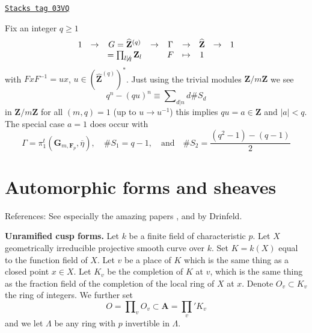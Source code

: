\begin{example}[Commutative]
\label{trace-example-commutative}
\href{https://stacks.math.columbia.edu/tag/03VQ}{\texttt{Stacks tag 03VQ}}

Fix an integer $q\geq 1$
$$
\begin{matrix}
1 &
\to &
G = \widehat{\mathbf{Z}}^{(q)} &
\to &
\Gamma &
\to &
\widehat{\mathbf{Z}} &
\to &
1 \\
&
&
= \prod_{l\not \mid q} \mathbf{Z}_l &
&
F &
\mapsto &
1
\end{matrix}
$$
with $FxF^{-1} = ux$, $u \in (\widehat{\mathbf{Z}}^{(q)})^*$.
Just using the trivial modules
$\mathbf{Z}/m\mathbf{Z}$ we see
$$
q^n - (qu)^n \equiv \sum\nolimits_{d|n} d\# S_d
$$
in $\mathbf{Z}/m\mathbf{Z}$ for all $(m, q)=1$ (up to
$u \to u^{-1}$) this implies $qu = a\in \mathbf{Z}$
and $|a| < q$. The special case $a = 1$ does occur with
$$
\Gamma = \pi_1^t(\mathbf{G}_{m, \mathbf{F}_p}, \overline \eta),
\quad
\# S_1 = q - 1,
\quad\text{and}\quad
\# S_2 = \frac{(q^2-1)-(q-1)}{2}
$$
\end{example}



\section{Automorphic forms and sheaves}
\label{trace-section-automorphic}
References: See especially the amazing papers
\cite{D1}, \cite{D2} and \cite{D0} by Drinfeld.

\medskip\noindent
{\bf Unramified cusp forms.}
Let $k$ be a finite field of characteristic $p$.
Let $X$ geometrically irreducible projective smooth curve over $k$.
Set $K = k(X)$ equal to the function field of $X$.
Let $v$ be a place of $K$ which is the same thing as a
closed point $x\in X$. Let $K_v$ be the completion of $K$ at $v$, which
is the same thing as the fraction field of the completion of
the local ring of $X$ at $x$.
Denote $O_v\subset K_v$ the ring of integers. We further set
$$
O = \prod\nolimits_v O_v \subset \mathbf{A} = \prod_v' K_v
$$
and we let $\Lambda$ be any ring with $p$ invertible in $\Lambda$.

